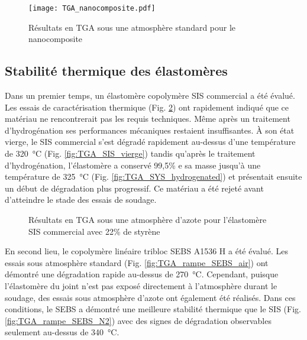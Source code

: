 \begin{figure}[htb]
	\centering
	\texttt{[image: TGA\_nanocomposite.pdf]}
	\caption{Résultats en TGA sous une atmosphère standard pour le nanocomposite}
	\label{fig:TGA_nanocomposite}
\end{figure}

\FloatBarrier
\subsection{Stabilité thermique des élastomères}

Dans un premier temps, un élastomère copolymère SIS commercial a été évalué. 
Les essais de caractérisation thermique (Fig. \ref{fig:TGA_SIS}) ont rapidement indiqué que ce matériau ne rencontrerait pas les requis techniques. 
Même après un traitement d'hydrogénation ses performances mécaniques restaient insuffisantes. 
À son état vierge, le SIS commercial s'est dégradé rapidement au-dessus d'une température de \SI{320}{\celsius} (Fig. \ref{fig:TGA_SIS_vierge}) tandis qu'après le traitement d'hydrogénation, l'élastomère a conservé 99,5\% e sa masse jusqu'à une température de \SI{325}{\celsius} (Fig. \ref{fig:TGA_SYS_hydrogenated}) et présentait ensuite un début de dégradation plus progressif.  
Ce matériau a été rejeté avant d'atteindre le stade des essais de soudage. 

\begin{figure}[h]
	\centering
	\qquad
	\caption{Résultats en TGA sous une atmosphère d'azote pour l'élastomère SIS commercial avec 22\% de styrène}
	\label{fig:TGA_SIS}
\end{figure}

\FloatBarrier
En second lieu, le copolymère linéaire tribloc SEBS A1536 H a été évalué. 
Les essais sous atmosphère standard (Fig. \ref{fig:TGA_rampe_SEBS_air}) ont démontré une dégradation rapide au-dessus de \SI{270}{\celsius}. 
Cependant, puisque l'élastomère du joint n'est pas exposé directement à l'atmosphère durant le soudage, des essais sous atmosphère d'azote ont également été réalisés. 
Dans ces conditions, le SEBS a démontré une meilleure stabilité thermique que le SIS (Fig. \ref{fig:TGA_rampe_SEBS_N2}) avec des signes de dégradation observables seulement au-dessus de \SI{340}{\celsius}. 

